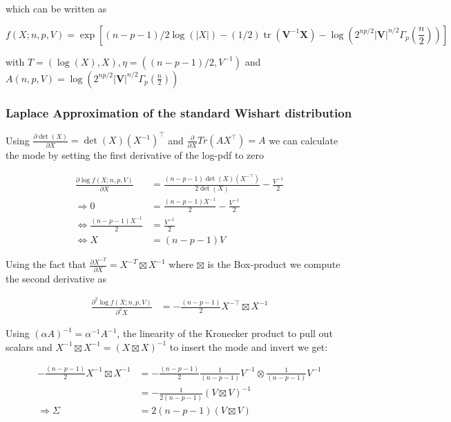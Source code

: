 \documentclass{article}
\begin{document}
which can be written as

\begin{equation}
f(X; n,p,V) = \exp \left[(n-p-1)/2 \log(|X|) -(1/2)\operatorname{tr}({\mathbf V}^{-1}\mathbf{X}) - \log\left(2^{np/2} \left|{\mathbf V}\right|^{n/2} \Gamma_p\left(\frac {n}{2}\right )\right) \right]
\end{equation}

with $T=(\log(X), X), \eta=((n-p-1)/2, V^{-1})$ and $A(n,p,V)=\log\left(2^{np/2} \left|{\mathbf V}\right|^{n/2} \Gamma_p\left(\frac {n}{2}\right )\right)$

\subsubsection{Laplace Approximation of the standard Wishart distribution}

Using $\frac{\partial \det(X)}{\partial X} = \det(X)(X^{-1})^\top$ and $\frac{\partial}{\partial X} Tr(AX^\top) = A$ we can calculate the mode by setting the first derivative of the log-pdf to zero

\begin{align*}
\frac{\partial \log f(X; n,p,V)}{\partial X} &= \frac{(n-p-1)\det(X)(X^{-\top})}{2\det(X)} - \frac{V^{-1}}{2} \\
\Rightarrow 0 &= \frac{(n-p-1)X^{-1}}{2} - \frac{V^{-1}}{2} \\
\Leftrightarrow  \frac{(n-p-1)X^{-1}}{2} &= \frac{V^{-1}}{2} \\
\Leftrightarrow X &= (n-p-1)V
\end{align*}

Using the fact that $\frac{\partial X^{-T}}{\partial X} = X^{-T} \boxtimes X^{-1}$ where $\boxtimes$ is the Box-product we compute the second derivative as

\begin{align*}
\frac{\partial^2 \log f(X; n,p,V)}{\partial^2 X} &= -\frac{(n-p-1)}{2} X^{-\top} \boxtimes X^{-1}
\end{align*}

Using $(\alpha A)^{-1} = \alpha^{-1}A^{-1}$, the linearity of the Kronecker product to pull out scalars and $X^{-1} \boxtimes X^{-1} = (X \boxtimes X)^{-1}$ to insert the mode and invert we get:

\begin{align*}
-\frac{(n-p-1)}{2} X^{-1} \boxtimes X^{-1} &= -\frac{(n-p-1)}{2} \frac{1}{(n-p-1)} V^{-1} \otimes \frac{1}{(n-p-1)} V^{-1} \\
&= -\frac{1}{2(n-p-1)}(V \boxtimes V)^{-1} \\
\Rightarrow \Sigma &= 2(n-p-1)(V \boxtimes V)
\end{align*}
\end{document}

